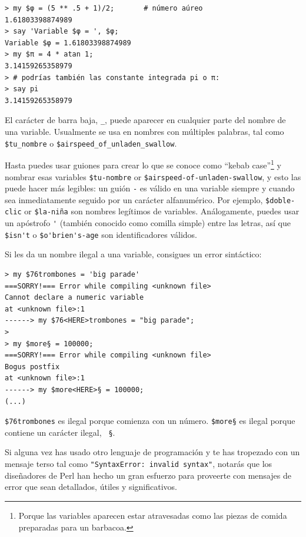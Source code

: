 \begin{lstlisting}
> my $φ = (5 ** .5 + 1)/2;       # número aúreo
1.61803398874989
> say 'Variable $φ = ', $φ;
Variable $φ = 1.61803398874989
> my $π = 4 * atan 1; 
3.14159265358979
> # podrías también las constante integrada pi o π:
> say pi
3.14159265358979
\end{lstlisting}

El carácter de barra baja, \verb"_", puede aparecer en cualquier
parte del nombre de una variable. Usualmente se usa en nombres con
múltiples palabras, tal como \verb"$tu_nombre" o \verb"$airspeed_of_unladen_swallow". 

Hasta puedes usar guiones para crear lo que se conoce como
``kebab case''\footnote{Porque las variables aparecen estar
atravesadas como las piezas de comida preparadas para un barbacoa.}
y nombrar esas variables \verb"$tu-nombre" or \verb"$airspeed-of-unladen-swallow",
y esto las puede hacer más legibles: un guión \verb'-' es válido en una variable
siempre y cuando sea inmediatamente seguido por un carácter alfanumérico.
Por ejemplo, \verb"$doble-clic" or \verb"$la-niña" son nombres legítimos
de variables. Análogamente, puedes usar un apóstrofo \verb"'" 
(también conocido como comilla simple) entre las letras, así que 
\verb"$isn't" o \verb"$o'brien's-age" son identificadores válidos. 


Si les da un nombre ilegal a una variable, consigues 
un error sintáctico:

\begin{lstlisting}
> my $76trombones = 'big parade'
===SORRY!=== Error while compiling <unknown file>
Cannot declare a numeric variable
at <unknown file>:1
------> my $76<HERE>trombones = "big parade";
>
> my $more§ = 100000;
===SORRY!=== Error while compiling <unknown file>
Bogus postfix
at <unknown file>:1
------> my $more<HERE>§ = 100000;
(...)
\end{lstlisting}
%
{\tt \$76trombones} es ilegal porque comienza con un número.
{\tt \$more§} es ilegal porque contiene un carácter ilegal, {\tt
§}. 

Si alguna vez has usado otro lenguaje de programación y 
te has tropezado con un mensaje terso tal como {\tt"SyntaxError: invalid syntax"},
notarás que los diseñadores de Perl han hecho un gran esfuerzo
para proveerte con mensajes de error que sean detallados, útiles
y significativos.

